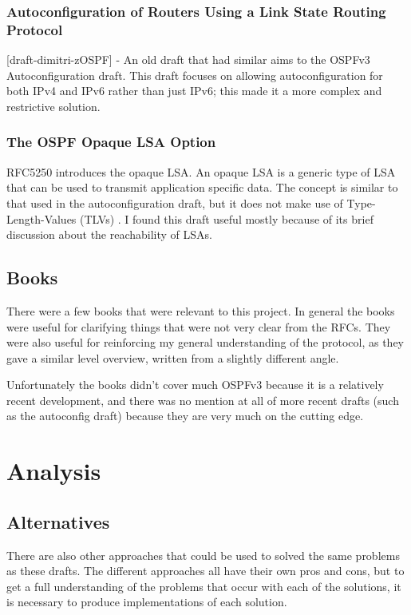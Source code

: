 \documentclass[12pt]{report}
\begin{document}
\subsection{Autoconfiguration of Routers Using a Link State Routing Protocol}
[draft-dimitri-zOSPF] - An old draft that had similar aims to the OSPFv3 
Autoconfiguration draft. This draft focuses on allowing autoconfiguration for both 
IPv4 and IPv6 rather than just IPv6; this made it a more complex and restrictive 
solution. 

\subsection{The OSPF Opaque LSA Option}
RFC5250 introduces the opaque LSA\@. An opaque LSA is a generic type of LSA
that can be used to transmit application specific data. The concept is similar
to that used in the autoconfiguration draft, but it does not make use of
Type-Length-Values (TLVs) . I found this
draft useful mostly because of its brief discussion about the  reachability of
LSAs.

\section{Books}
There were a few books that were relevant to this project. In general the books
were useful for clarifying things that were not very clear from the RFCs. They
were also useful for reinforcing my general understanding of the protocol, as
they gave a similar level overview, written from a slightly different angle. 

Unfortunately the books didn't cover much OSPFv3 because it is a relatively
recent development, and there was no mention at all of more recent drafts (such
as the autoconfig draft) because they are very much on the cutting edge.

\chapter{Analysis}

\section{Alternatives}
There are also other approaches that could be used to solved the same problems
as these drafts. The different approaches all have their own pros and cons, but
to get a full understanding of the problems that occur with each of the
solutions, it is necessary to produce implementations of each solution.
\end{document}
